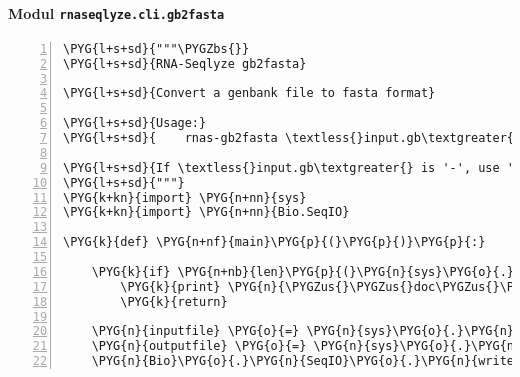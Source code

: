 \paragraph{Modul \texttt{rnaseqlyze.cli.gb2fasta}}
\label{rnaseqlyze-pdf:modul-rnaseqlyze-cli-gb2fasta}
\begin{Verbatim}[commandchars=\\\{\},numbers=left,firstnumber=1,stepnumber=5]
\PYG{l+s+sd}{"""\PYGZbs{}}
\PYG{l+s+sd}{RNA-Seqlyze gb2fasta}

\PYG{l+s+sd}{Convert a genbank file to fasta format}

\PYG{l+s+sd}{Usage:}
\PYG{l+s+sd}{    rnas-gb2fasta \textless{}input.gb\textgreater{} \textless{}output.fa\textgreater{}}

\PYG{l+s+sd}{If \textless{}input.gb\textgreater{} is '-', use 'sys.stdin, if \textless{}output.fa\textgreater{} is '-', use 'sys.stdout'.}
\PYG{l+s+sd}{"""}
\PYG{k+kn}{import} \PYG{n+nn}{sys}
\PYG{k+kn}{import} \PYG{n+nn}{Bio.SeqIO}

\PYG{k}{def} \PYG{n+nf}{main}\PYG{p}{(}\PYG{p}{)}\PYG{p}{:}

    \PYG{k}{if} \PYG{n+nb}{len}\PYG{p}{(}\PYG{n}{sys}\PYG{o}{.}\PYG{n}{argv}\PYG{p}{)} \PYG{o}{\textless{}} \PYG{l+m+mi}{2} \PYG{o+ow}{or} \PYG{n}{sys}\PYG{o}{.}\PYG{n}{argv}\PYG{p}{[}\PYG{l+m+mi}{1}\PYG{p}{]} \PYG{o+ow}{in} \PYG{p}{(}\PYG{l+s}{'}\PYG{l+s}{-h}\PYG{l+s}{'}\PYG{p}{,} \PYG{l+s}{'}\PYG{l+s}{--help}\PYG{l+s}{'}\PYG{p}{)}\PYG{p}{:}
        \PYG{k}{print} \PYG{n}{\PYGZus{}\PYGZus{}doc\PYGZus{}\PYGZus{}}
        \PYG{k}{return}

    \PYG{n}{inputfile} \PYG{o}{=} \PYG{n}{sys}\PYG{o}{.}\PYG{n}{argv}\PYG{p}{[}\PYG{l+m+mi}{1}\PYG{p}{]} \PYG{o}{==} \PYG{l+s}{'}\PYG{l+s}{-}\PYG{l+s}{'} \PYG{o+ow}{and} \PYG{n}{sys}\PYG{o}{.}\PYG{n}{stdin} \PYG{o+ow}{or} \PYG{n+nb}{open}\PYG{p}{(}\PYG{n}{sys}\PYG{o}{.}\PYG{n}{argv}\PYG{p}{[}\PYG{l+m+mi}{1}\PYG{p}{]}\PYG{p}{)}
    \PYG{n}{outputfile} \PYG{o}{=} \PYG{n}{sys}\PYG{o}{.}\PYG{n}{argv}\PYG{p}{[}\PYG{l+m+mi}{2}\PYG{p}{]} \PYG{o}{==} \PYG{l+s}{'}\PYG{l+s}{-}\PYG{l+s}{'} \PYG{o+ow}{and} \PYG{n}{sys}\PYG{o}{.}\PYG{n}{stdout} \PYG{o+ow}{or} \PYG{n+nb}{open}\PYG{p}{(}\PYG{n}{sys}\PYG{o}{.}\PYG{n}{argv}\PYG{p}{[}\PYG{l+m+mi}{2}\PYG{p}{]}\PYG{p}{,} \PYG{l+s}{"}\PYG{l+s}{w}\PYG{l+s}{"}\PYG{p}{)}
    \PYG{n}{Bio}\PYG{o}{.}\PYG{n}{SeqIO}\PYG{o}{.}\PYG{n}{write}\PYG{p}{(}\PYG{n}{Bio}\PYG{o}{.}\PYG{n}{SeqIO}\PYG{o}{.}\PYG{n}{parse}\PYG{p}{(}\PYG{n}{inputfile}\PYG{p}{,} \PYG{l+s}{"}\PYG{l+s}{genbank}\PYG{l+s}{"}\PYG{p}{)}\PYG{p}{,} \PYG{n}{outputfile}\PYG{p}{,} \PYG{l+s}{"}\PYG{l+s}{fasta}\PYG{l+s}{"}\PYG{p}{)}
\end{Verbatim}


